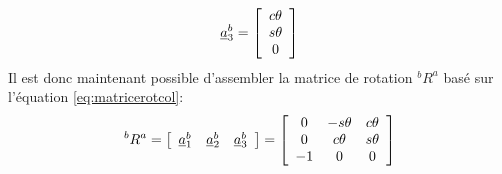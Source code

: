 \begin{example}
\begin{align}
\underline{a}_3^b = \left[ \begin{array}{c} c\theta \\ s\theta \\ 0   \end{array} \right]
\end{align}
Il est donc maintenant possible d'assembler la matrice de rotation $^bR^a$ basé sur l'équation \eqref{eq:matricerotcol}:
\begin{align}
^bR^a =\left[ \begin{array}{c c c}
	\underline{a}_1^b  & \underline{a}_2^b & \underline{a}_3^b
\end{array}  \right]
= \left[ \begin{array}{c c c}
	0 & -s\theta & c\theta \\
	0 & c\theta & s\theta \\
-1 & 0 & 0 
\end{array}  \right]
\end{align}
\end{example}

